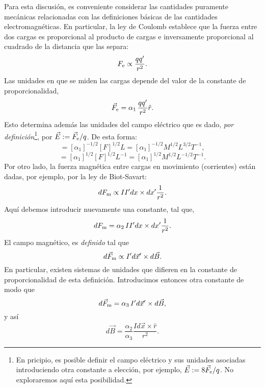 Para esta discusión, es conveniente considerar las cantidades puramente mecánicas relacionadas con las definiciones básicas de las cantidades electromagnéticas. En particular, la ley de Coulomb establece que la fuerza entre dos cargas es proporcional al producto de cargas e inversamente proporcional al cuadrado de la distancia que las separa:
\begin{equation}
 F_{\rm e}\propto\frac{q q'}{r^2}.
\end{equation} 
Las unidades en que se miden las cargas depende del valor de la constante de proporcionalidad,
\begin{equation}
 \vec{F}_{\rm e}=\alpha_1\,\frac{q q'}{r^2}\hat{r}.
\end{equation} 
Esto determina además las unidades del campo eléctrico que es dado, \textit{por definición}\footnote{En pricipio, es posible definir el campo eléctrico y sus unidades asociadas introduciendo otra constante a elección, por ejemplo, $\vec{E}:=8 \vec{F}_{\rm e}/q$. No exploraremos aquí esta posibilidad.}, por $\vec{E}:=\vec{F}_{\rm e}/q$. De esta forma:
\begin{equation}
 [q]=[\alpha_1]^{-1/2}[F]^{1/2}L =[\alpha_1]^{-1/2}M^{1/2}L^{3/2}T^{-1},
\end{equation}
\begin{equation}
 [E]=[\alpha_1]^{1/2}[F]^{1/2}L^{-1}=[\alpha_1]^{1/2}M^{1/2}L^{-1/2}T^{-1}.
\end{equation}
Por otro lado, la fuerza magnética entre cargas en movimiento (corrientes) están dadas, por ejemplo, por la ley de Biot-Savart:
\begin{equation}
 dF_{\rm m}\propto II' dx \times dx' \frac{1}{r^2}.
\end{equation}
Aquí debemos introducir nuevamente una constante, tal que,
\begin{equation}
 dF_{\rm m}=\alpha_2\, II'dx \times dx' \frac{1}{r^2}. \label{dfe}
\end{equation}
El campo magnético, es \textit{definido} tal que
\begin{equation}
 d\vec{F}_{\rm m}\propto I'd\vec{x}' \times d\vec{B}.
\end{equation}
En particular, existen sistemas de unidades que difieren en la constante de proporcionalidad de esta definición. Introducimos entonces otra constante de modo que
\begin{equation}\label{dFa3}
 d\vec{F}_{\rm m}=\alpha_3\,I'd\vec{x}' \times d\vec{B},
\end{equation}
y así
\begin{equation}
 d\vec{B}=\frac{\alpha_2}{\alpha_3} \frac{Id\vec{x}\times\hat{r}}{r^2}.
\end{equation}
